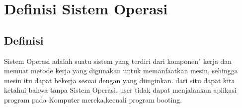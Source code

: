\section{Definisi Sistem Operasi}
		\subsection{Definisi}
		\hspace*{1cm} Sistem Operasi adalah suatu sistem yang terdiri dari komponen" kerja dan memuat metode kerja yang digunakan untuk memanfaatkan mesin, sehingga mesin itu dapat bekerja sesuai dengan yang diinginkan. dari situ dapat kita ketahui bahwa tanpa Sistem Operasi, user tidak dapat menjalankan aplikasi program pada Komputer mereka,kecuali program booting.
